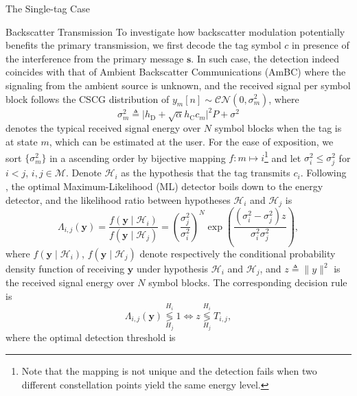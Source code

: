 \documentclass[journal]{IEEEtran}
\begin{document}
\begin{section}{The Single-tag Case}
		\begin{subsection}{Backscatter Transmission}
			To investigate how backscatter modulation potentially benefits the primary transmission, we first decode the tag symbol $c$ in presence of the interference from the primary message $\boldsymbol{s}$. In such case, the detection indeed coincides with that of Ambient Backscatter Communications (AmBC) where the signaling from the ambient source is unknown, and the received signal per symbol block follows the CSCG distribution of $y_m[n] \sim \mathcal{CN}(0,\sigma_m^2)$, where
			\begin{equation}
				\sigma_m^2 \triangleq \lvert h_{\mathrm{D}} + \sqrt{\alpha} h_{\mathrm{C}} c_m \rvert^2 P + \sigma^2
				\label{eq:typical_energy}
			\end{equation}
			denotes the typical received signal energy over $N$ symbol blocks when the tag is at state $m$, which can be estimated at the user. For the ease of exposition, we sort $\{\sigma_m^2\}$ in a ascending order by bijective mapping $f \colon m \mapsto i$\footnote{Note that the mapping is not unique and the detection fails when two different constellation points yield the same energy level.} and let $\sigma_i^2 \le \sigma_j^2$ for $i < j$, $i,j \in \mathcal{M}$. Denote $\mathcal{H}_i$ as the hypothesis that the tag transmits $c_i$. Following \cite{Qian2019}, the optimal Maximum-Likelihood (ML) detector boils down to the energy detector, and the likelihood ratio between hypotheses $\mathcal{H}_i$ and $\mathcal{H}_j$ is
			\begin{equation}
				\Lambda_{i,j}(\boldsymbol{y}) = \frac{f(\boldsymbol{y} \mid \mathcal{H}_i)}{f(\boldsymbol{y} \mid \mathcal{H}_j)} = \left( \frac{\sigma_j^2}{\sigma_i^2} \right)^N \exp \left( \frac{(\sigma_i^2 - \sigma_j^2) z}{\sigma_i^2 \sigma_j^2} \right),
			\end{equation}
			where $f(\boldsymbol{y} \mid \mathcal{H}_i)$, $f(\boldsymbol{y} \mid \mathcal{H}_j)$ denote respectively the conditional probability density function of receiving $\boldsymbol{y}$ under hypothesis $\mathcal{H}_i$ and $\mathcal{H}_j$, and $z \triangleq \lVert y \rVert^2$ is the received signal energy over $N$ symbol blocks. The corresponding decision rule is
			\begin{equation}
				\Lambda_{i,j}(\boldsymbol{y}) \underset{H_j}{\overset{H_i}{\lessgtr}} 1 \iff z \underset{H_j}{\overset{H_i}{\lessgtr}} T_{i,j},
			\end{equation}
			where the optimal detection threshold is
			\begin{equation}

\end{equation}
\end{subsection}
\end{section}
\end{document}
